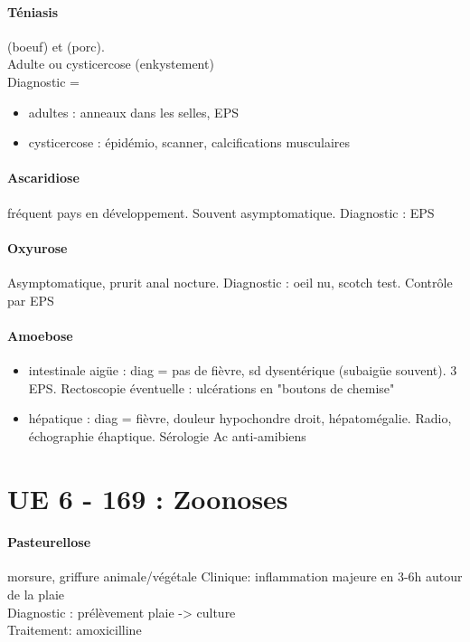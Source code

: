 \paragraph{Téniasis}  (boeuf) et  (porc).\\
  Adulte ou cysticercose (enkystement)\\
  Diagnostic = 
  \begin{itemize}
    \item adultes : anneaux dans les selles, EPS
    \item cysticercose : épidémio, scanner, calcifications musculaires
  \end{itemize}

\paragraph{Ascaridiose} fréquent pays en développement. Souvent asymptomatique.
Diagnostic : EPS

\paragraph{Oxyurose} Asymptomatique, prurit anal nocture. Diagnostic : oeil nu,
scotch test. Contrôle par EPS

\paragraph{Amoebose} 
\begin{itemize}
  \item intestinale aigüe : diag = pas de fièvre, sd dysentérique (subaigüe
    souvent). 3 EPS. Rectoscopie éventuelle : ulcérations en "boutons de chemise"
  \item hépatique : diag = fièvre, douleur hypochondre droit, hépatomégalie.
    Radio, échographie éhaptique. Sérologie Ac anti-amibiens
\end{itemize}

\section{UE 6 - 169 : Zoonoses}%
\label{sec:ue_6_169_zoonoses}

\paragraph{Pasteurellose} morsure, griffure animale/végétale
Clinique: inflammation majeure en 3-6h autour de la plaie\\
Diagnostic : prélèvement plaie -> culture\\
Traitement: amoxicilline

